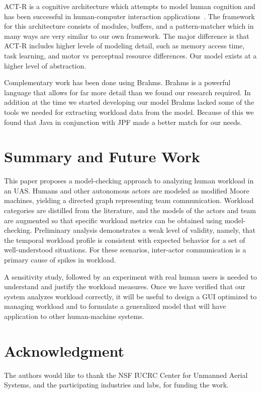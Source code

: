\documentclass[letterpaper]{article}
\begin{document}
ACT-R is a cognitive architecture which attempts to model human cognition and
has been successful in human-computer interaction applications~\cite{anderson2004integrated,lebiere2013cognitive}.  The
framework for this architecture consists of modules, buffers, and a pattern-matcher which in many ways are very similar to our own framework.  The major
difference is that ACT-R includes higher levels of modeling detail, such as memory access
time, task learning, and motor vs perceptual resource differences.  Our model exists at a higher level of abstraction.

Complementary work has been done using Brahms.
Brahms is a powerful language that allows for far more detail than we found our research required.
In addition at the time we started developing our model Brahms lacked some of the tools we needed for extracting workload data from the model. Because of this we found that Java in conjunction with JPF made a better match for our needs.

\section{Summary and Future Work}

This paper proposes a model-checking approach to analyzing human workload in an UAS.  Humans and other autonomous actors are modeled as modified Moore machines, yielding a directed graph representing team communication.  Workload categories are distilled from the literature, and the models of the actors and team are augmented so that specific workload metrics can be obtained using model-checking.  Preliminary analysis demonstrates a weak level of validity, namely, that the temporal workload profile is consistent with expected behavior for a set of well-understood situations.  For these scenarios, inter-actor communication is a primary cause of spikes in workload. 

A sensitivity study, followed by an experiment with real human users is needed to understand and justify the workload measures. Once we have verified that our system analyzes workload correctly, it will be useful to design a GUI optimized to managing workload and to formulate a generalized model that will have application to other human-machine systems.


\section*{Acknowledgment}
The authors would like to thank the NSF IUCRC Center for Unmanned Aerial Systems, and the participating industries and labs, for funding the work.






\end{document}

